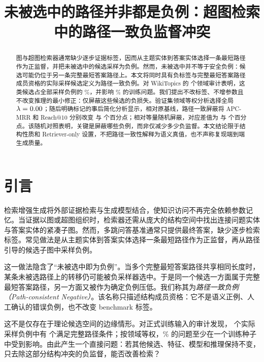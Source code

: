 \documentclass[sigconf,review,anonymous]{acmart}
\title{未被选中的路径并非都是负例：超图检索中的路径一致负监督冲突}
\begin{document}
\begin{abstract}
图与超图检索器通常缺少逐步证据标签，因而从主题实体到答案实体选择一条最短路径作为正监督，并把未被选中的候选采样为负例。然而，未被选中并不等于安全负例：候选可能仍位于另一条完整最短答案路径上。本文将同时具有负标签与完整最短答案路径成员资格的实际采样候选定义为路径一致负例。对 WikiTopics 的 \DatasetCount{} 个领域审计表明，这类候选占全部采样负例的 \ConflictRate\%，并影响 \AffectedQueryRate\% 的训练问题。我们提出不改标签、不增参数且不改变推理的最小修正：仅屏蔽这些候选的负损失。验证集领域等权分析选择全局 $\lambda=0.00$；随后明确标记的事后简化分析显示，相对原基线，路径一致屏蔽将 APC-MRR 和 Reach@10 分别改变 \OursBaselineMRRDelta{} 与 \OursBaselineReachTenDelta{} 个百分点；相对等量随机屏蔽，对应差值为 \OursRandomMRRDelta{} 与 \OursRandomReachTenDelta{} 个百分点。该随机对照表明，关键是屏蔽哪些负例，而非仅减少多少负监督。本文结论限于结构性质和 Retriever-only 设置，不把路径一致性解释为语义真值，也不声称复现端到端生成质量。
\end{abstract}

\maketitle

\section{引言}

检索增强生成将外部证据检索与生成模型结合，使知识访问不再完全依赖参数记忆\cite{lewis2020rag}。当证据以图或超图组织时，检索器还需从庞大的结构空间中找出连接问题实体与答案实体的紧凑子图\cite{sun2019pullnet,zhang2022subgraph,he2024gretriever,lien2026hyperrag}。然而，多跳问答基准通常只提供最终答案，缺少逐步检索标签。常见做法是从主题实体到答案实体选择一条最短路径作为正监督，再从路径引导的候选子图中采样负例。

这一做法隐含了``未被选中即为负例''。当多个完整最短答案路径共享相同长度时，某条未被选路径上的转移仍可能被负采样器选中。于是同一个候选一方面属于完整最短答案路径，另一方面又被作为确定负例压低。我们称其为\emph{路径一致负例（Path-consistent Negative）}。该名称只描述结构成员资格：它不是语义正例、人工确认的错误负例，也不改变 benchmark 标签。

这不是仅存在于理论候选空间的边缘情形。对正式训练输入的审计发现，\SampledNegativeCount{} 个实际采样负例中有 \PathConsistentNegativeCount{} 个满足完整路径条件；按领域等权，\AffectedQueryRate\% 的问题至少在一个训练种子中受到影响。由此产生一个直接问题：若其他候选、特征、模型和推理保持不变，只去除这部分结构冲突的负监督，能否改善检索？
\end{document}
